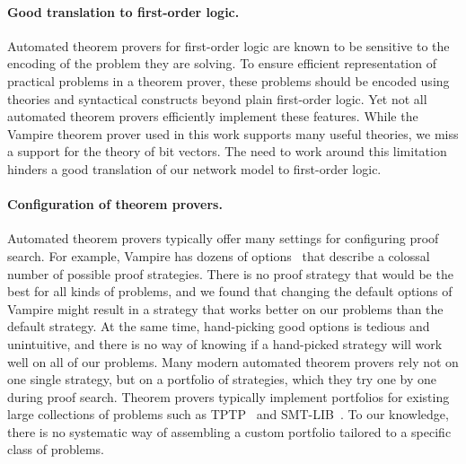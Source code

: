 \paragraph{Good translation to first-order logic.}
Automated theorem provers for first-order logic are known to be sensitive to the encoding of the problem they are solving. To ensure efficient representation of practical problems in a theorem prover, these problems should be encoded using theories and syntactical constructs beyond plain first-order logic. Yet not all automated theorem provers efficiently implement these features. While the Vampire theorem prover used in this work supports many useful theories, we miss a support for the theory of bit vectors. The need to work around this limitation hinders a good translation of our network model to first-order logic. %


\paragraph{Configuration of theorem provers.}
Automated theorem provers typically offer many settings for configuring proof search. For example, Vampire has dozens of options~\cite{DBLP:conf/cade/Reger0V14} that describe a colossal number of possible proof strategies. There is no proof strategy that would be the best for all kinds of problems, and we found that changing the default options of Vampire might result in a strategy that works better on our problems than the default strategy. At the same time, hand-picking good options is tedious and unintuitive, and there is no way of knowing if a hand-picked strategy will work well on all of our problems. Many modern automated theorem provers rely not on one single strategy, but on a portfolio of strategies, which they try one by one during proof search. Theorem provers typically implement portfolios for existing large collections of problems such as TPTP~\cite{TPTP} and SMT-LIB~\cite{SMT-LIB}. To our knowledge, there is no systematic way of assembling a custom portfolio tailored to a specific class of problems.



